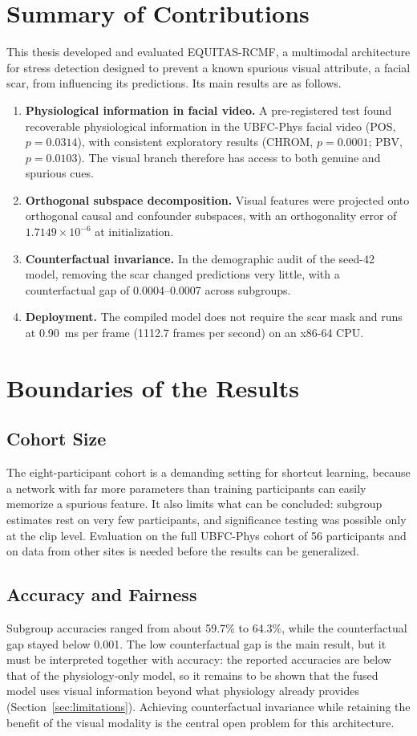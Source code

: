 \section{Summary of Contributions}
This thesis developed and evaluated EQUITAS-RCMF, a multimodal architecture for stress detection designed to prevent a known spurious visual attribute, a facial scar, from influencing its predictions. Its main results are as follows.
\begin{enumerate}
    \item \textbf{Physiological information in facial video.} A pre-registered test found recoverable physiological information in the UBFC-Phys facial video (POS, $p = 0.0314$), with consistent exploratory results (CHROM, $p = 0.0001$; PBV, $p = 0.0103$). The visual branch therefore has access to both genuine and spurious cues.
    \item \textbf{Orthogonal subspace decomposition.} Visual features were projected onto orthogonal causal and confounder subspaces, with an orthogonality error of $1.7149 \times 10^{-6}$ at initialization.
    \item \textbf{Counterfactual invariance.} In the demographic audit of the seed-42 model, removing the scar changed predictions very little, with a counterfactual gap of 0.0004--0.0007 across subgroups.
    \item \textbf{Deployment.} The compiled model does not require the scar mask and runs at 0.90~ms per frame (1112.7 frames per second) on an x86-64 CPU.
\end{enumerate}

\section{Boundaries of the Results}
\subsection{Cohort Size}
The eight-participant cohort is a demanding setting for shortcut learning, because a network with far more parameters than training participants can easily memorize a spurious feature. It also limits what can be concluded: subgroup estimates rest on very few participants, and significance testing was possible only at the clip level. Evaluation on the full UBFC-Phys cohort of 56 participants and on data from other sites is needed before the results can be generalized.

\subsection{Accuracy and Fairness}
Subgroup accuracies ranged from about 59.7\% to 64.3\%, while the counterfactual gap stayed below 0.001. The low counterfactual gap is the main result, but it must be interpreted together with accuracy: the reported accuracies are below that of the physiology-only model, so it remains to be shown that the fused model uses visual information beyond what physiology already provides (Section~\ref{sec:limitations}). Achieving counterfactual invariance while retaining the benefit of the visual modality is the central open problem for this architecture.

